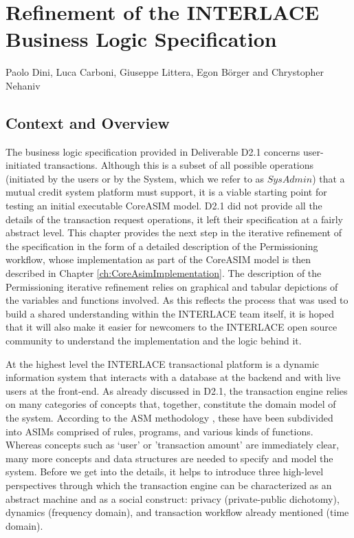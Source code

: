 \chapter{Refinement of the INTERLACE Business Logic Specification}
\label{ch:UpdateBLS}

\vspace{-1cm}
\begin{center}
Paolo Dini, Luca Carboni, Giuseppe Littera, Egon B\"orger and Chrystopher Nehaniv
\end{center}

\section{Context and Overview}
The business logic specification provided in Deliverable D2.1 \cite{INTERLACE_D21} concerns user-initiated transactions. Although this is a subset of all possible operations (initiated by the users or by the System, which we refer to as $SysAdmin$) that a mutual credit system platform must support, it is a viable starting point for testing an initial executable CoreASIM model. D2.1 did not provide all the details of the transaction request operations, it left their specification at a fairly abstract level. This chapter provides the next step in the iterative refinement of the specification in the form of a detailed description of the Permissioning workflow, whose implementation as part of the CoreASIM model is then described in Chapter \ref{ch:CoreAsimImplementation}. The description of the Permissioning iterative refinement relies on graphical and tabular depictions of the variables and functions involved. As this reflects the process that was used to build a shared understanding within the INTERLACE team itself, it is hoped that it will also make it easier for newcomers to the INTERLACE open source community to understand the implementation and the logic behind it.

At the highest level the INTERLACE transactional platform is a dynamic information system that interacts with a database at the backend and with live users at the front-end. As already discussed in D2.1, the transaction engine relies on many categories of concepts that, together, constitute the domain model of the system. According to the ASM methodology \cite{BoergerStaerk2003}, these have been subdivided into ASIMs comprised of rules, programs, and various kinds of functions. Whereas concepts such as `user' or 'transaction amount' are immediately clear, many more concepts and data structures are needed to specify and model the system. Before we get into the details, it helps to introduce three high-level perspectives through which the transaction engine can be characterized as an abstract machine and as a social construct: privacy (private-public dichotomy), dynamics (frequency domain), and transaction workflow already mentioned (time domain).

